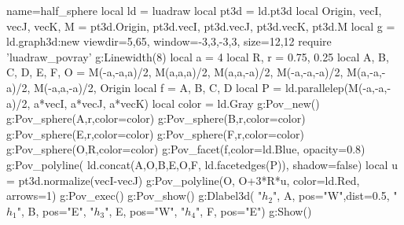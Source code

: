 \documentclass[border=5pt,tikz]{standalone}%
\begin{document}
\begin{luadraw}{name=half_sphere}
local ld = luadraw
local pt3d = ld.pt3d
local Origin, vecI, vecJ, vecK, M = pt3d.Origin, pt3d.vecI, pt3d.vecJ, pt3d.vecK, pt3d.M
local g = ld.graph3d:new{ viewdir={5,65}, window={-3,3,-3,3}, size={12,12} }
require 'luadraw_povray'
g:Linewidth(8)
local a = 4
local R, r = 0.75, 0.25
local A, B, C, D, E, F, O = M(-a,-a,a)/2, M(a,a,a)/2, M(a,a,-a)/2, M(-a,-a,-a)/2, M(a,-a,-a)/2, M(-a,a,-a)/2, Origin
local f = {A, B, C, D}
local P = ld.parallelep(M(-a,-a,-a)/2, a*vecI, a*vecJ, a*vecK)
local color = ld.Gray
g:Pov_new()
g:Pov_sphere(A,r,{color=color})
g:Pov_sphere(B,r,{color=color})
g:Pov_sphere(E,r,{color=color})
g:Pov_sphere(F,r,{color=color})
g:Pov_sphere(O,R,{color=color})
g:Pov_facet(f,{color=ld.Blue, opacity=0.8})
g:Pov_polyline( ld.concat({{A,O,B},{E,O,F}}, ld.facetedges(P)), {shadow=false})
local u = pt3d.normalize(vecI-vecJ)
g:Pov_polyline({O, O+3*R*u}, {color=ld.Red, arrows=1})
g:Pov_exec()
g:Pov_show()
g:Dlabel3d(
    "$h_2$", A, {pos="W",dist=0.5},
    "$h_1$", B, {pos="E"},
    "$h_3$", E, {pos="W"},
    "$h_4$", F, {pos="E"})
g:Show()
\end{luadraw}
\end{document}
